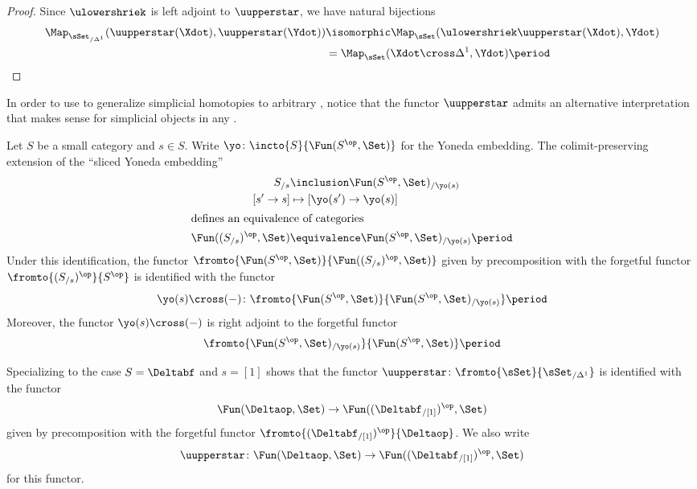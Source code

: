 \begin{proof}
	Since $ \ulowershriek $ is left adjoint to $ \uupperstar $, we have natural bijections
	\begin{align*}
		\Map_{\sSet_{/\Delta^1}}(\uupperstar(\Xdot),\uupperstar(\Ydot)) &\isomorphic \Map_{\sSet}(\ulowershriek\uupperstar(\Xdot),\Ydot) \\
		&= \Map_{\sSet}(\Xdot \cross \Delta^1,\Ydot) \period \qedhere
	\end{align*}
\end{proof}

In order to use  to generalize simplicial homotopies to arbitrary \categories, notice that the functor $ \uupperstar $ admits an alternative interpretation that makes sense for simplicial objects in any \category.

\begin{observation}
	Let $ S $ be a small category and $ s \in S $.
	Write $ \yo \colon \incto{S}{\Fun(S^{\op},\Set)} $ for the Yoneda embedding.
	The colimit-preserving extension of the ``sliced Yoneda embedding''
	\begin{align*}
		S_{/s} &\inclusion \Fun(S^{\op},\Set)_{/\yo(s)} \\ 
		[s' \to s] &\mapsto [\yo(s') \to \yo(s)] \\
		\intertext{defines an equivalence of categories}
		\Fun((S_{/s})^{\op},\Set) &\equivalence \Fun(S^{\op},\Set)_{/\yo(s)} \period
	\end{align*}
	Under this identification, the functor $ \fromto{\Fun(S^{\op},\Set)}{\Fun((S_{/s})^{\op},\Set)} $ given by precomposition with the forgetful functor $ \fromto{(S_{/s})^{\op}}{S^{\op}} $ is identified with the functor
	\begin{equation*}
		\yo(s) \cross (-) \colon \fromto{\Fun(S^{\op},\Set)}{\Fun(S^{\op},\Set)_{/\yo(s)}} \period
	\end{equation*}
	Moreover, the functor $ \yo(s) \cross (-) $ is right adjoint to the forgetful functor
	\begin{equation*}
		\fromto{\Fun(S^{\op},\Set)_{/\yo(s)}}{\Fun(S^{\op},\Set)} \period
	\end{equation*}
\end{observation}

\begin{nul}
	Specializing to the case $ S = \Deltabf $ and $ s = [1] $ shows that the functor $ \uupperstar \colon \fromto{\sSet}{\sSet_{/\Delta^1}} $ is identified with the functor
	\begin{equation*}
		\Fun(\Deltaop,\Set) \to \Fun((\Deltabf_{/[1]})^{\op},\Set)
	\end{equation*}
	given by precomposition with the forgetful functor $ \fromto{(\Deltabf_{/[1]})^{\op}}{\Deltaop} $.
	We also write
	\begin{equation*}
		\uupperstar \colon \Fun(\Deltaop,\Set) \to \Fun((\Deltabf_{/[1]})^{\op},\Set)
	\end{equation*}
	for this functor.
\end{nul}

